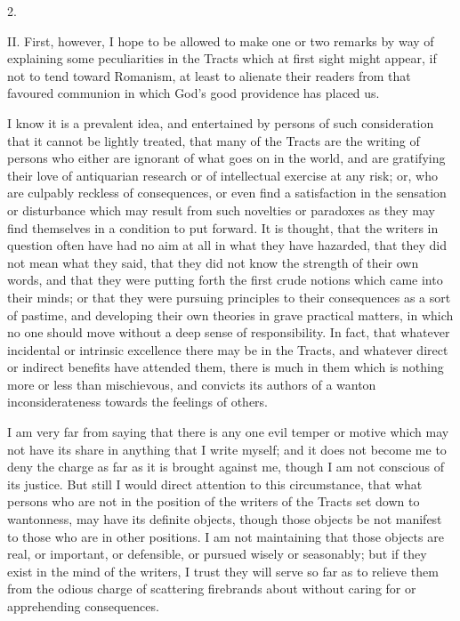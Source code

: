 2.

II.
First, however, I hope to be allowed to make one or two remarks by way
of explaining some peculiarities in the Tracts which at first sight
might appear, if not to tend toward Romanism, at least to alienate
their readers from that favoured communion in which God's good
providence has placed us.

I know it is a prevalent idea, and entertained by
persons of such consideration that it cannot be lightly treated, that
many of the Tracts are the writing of persons who either are
ignorant of what goes on in the world, and are gratifying their love
of antiquarian research or of intellectual exercise at any risk; or,
who are culpably reckless of consequences, or even find a satisfaction
in the sensation or disturbance which may result from such novelties
or paradoxes as they may find themselves in a condition to put
forward. It is thought, that the writers in question often have had no
aim at all in what they have hazarded, that they did not mean what
they said, that they did not know the strength of their own words, and
that they were putting forth the first crude notions which came into
their minds; or that they were pursuing principles to their
consequences as a sort of pastime, and developing their own theories
in grave practical matters, in which no one should move without a deep
sense of responsibility. In fact, that whatever incidental or
intrinsic excellence there may be in the Tracts, and whatever direct
or indirect benefits have attended them, there is much in them which
is nothing more or less than mischievous, and convicts its authors of
a wanton inconsiderateness towards the feelings of others.

I am very far from saying that there is any one
evil temper or motive which may not have its share in anything that I
write myself; and it does not become me to deny the charge as far as
it is brought against me, though I am not conscious of its justice.
But still I would direct attention to this circumstance, that what
persons who are not in the position of the writers of the Tracts set
down to wantonness, may have its definite objects, though those
objects be not manifest to those who are in other positions. I am not
maintaining that those objects are real, or important, or defensible,
or pursued wisely or seasonably; but if they exist in the mind of the
writers, I trust they will serve so far as to relieve them from the
odious charge of scattering firebrands about without caring for or
apprehending consequences.

